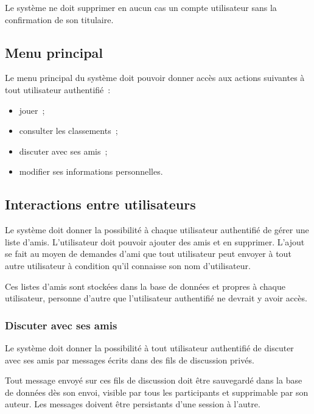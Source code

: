 Le système ne doit supprimer en aucun cas un compte
utilisateur sans la confirmation de son titulaire.

\subsection{Menu principal}

Le menu principal du système doit pouvoir donner accès aux
actions suivantes à tout utilisateur authentifié~:

\begin{itemize}
    \item jouer~;
    \item consulter les classements~;
    \item discuter avec ses amis~;
    \item modifier ses informations personnelles.
\end{itemize}

\subsection{Interactions entre utilisateurs}

Le système doit donner la possibilité à chaque utilisateur
authentifié de gérer une liste d'amis. L'utilisateur doit
pouvoir ajouter des amis et en supprimer. L'ajout se
fait au moyen de demandes d'ami que tout utilisateur peut
envoyer à tout autre utilisateur à condition qu'il connaisse
son nom d'utilisateur.

Ces listes d'amis sont stockées dans la base de données et
propres à chaque utilisateur, personne d'autre que
l'utilisateur authentifié ne devrait y avoir accès.

\subsubsection{Discuter avec ses amis}


Le système doit donner la possibilité à tout utilisateur
authentifié de discuter avec ses amis par messages écrits
dans des fils de discussion privés.


Tout message envoyé sur ces fils de discussion doit être
sauvegardé dans la base de données dès son envoi,
visible par tous les
participants et supprimable par son auteur. Les messages
doivent être persistants d'une session à l'autre.

